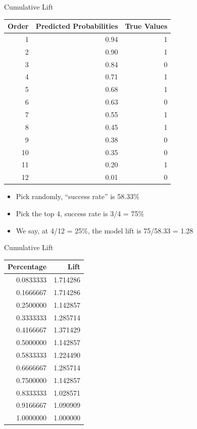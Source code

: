 \documentclass[
  ignorenonframetext,
]{beamer}
\providecommand{\tightlist}{%
  \setlength{\itemsep}{0pt}\setlength{\parskip}{0pt}}
\begin{document}
\begin{frame}{Cumulative Lift}
\protect\hypertarget{cumulative-lift-6}{}
\begin{longtable}[]{@{}rrr@{}}
\toprule
Order & Predicted Probabilities & True Values \\
\midrule
\endhead
1 & 0.94 & 1 \\
2 & 0.90 & 1 \\
3 & 0.84 & 0 \\
4 & 0.71 & 1 \\
5 & 0.68 & 1 \\
6 & 0.63 & 0 \\
7 & 0.55 & 1 \\
8 & 0.45 & 1 \\
9 & 0.38 & 0 \\
10 & 0.35 & 0 \\
11 & 0.20 & 1 \\
12 & 0.01 & 0 \\
\bottomrule
\end{longtable}

\begin{itemize}
\tightlist
\item
  Pick randomly, ``success rate'' is 58.33\%
\item
  Pick the top 4, success rate is 3/4 = 75\%
\item
  We say, at 4/12 = 25\%, the model lift is 75/58.33 = 1.28
\end{itemize}
\end{frame}

\begin{frame}{Cumulative Lift}
\protect\hypertarget{cumulative-lift-7}{}
\begin{longtable}[]{@{}rr@{}}
\toprule
Percentage & Lift \\
\midrule
\endhead
0.0833333 & 1.714286 \\
0.1666667 & 1.714286 \\
0.2500000 & 1.142857 \\
0.3333333 & 1.285714 \\
0.4166667 & 1.371429 \\
0.5000000 & 1.142857 \\
0.5833333 & 1.224490 \\
0.6666667 & 1.285714 \\
0.7500000 & 1.142857 \\
0.8333333 & 1.028571 \\
0.9166667 & 1.090909 \\
1.0000000 & 1.000000 \\
\bottomrule
\end{longtable}
\end{frame}
\end{document}
